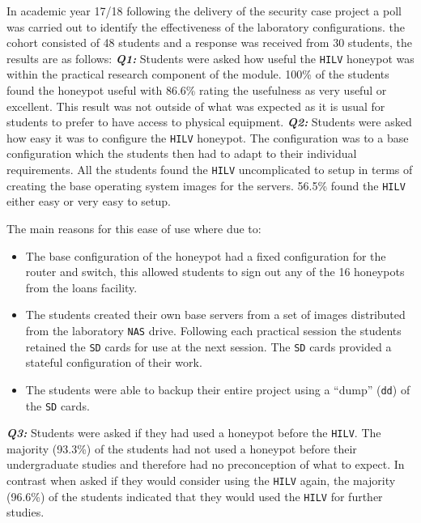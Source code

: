 \documentclass[10pt,journal]{IEEEtran}
\begin{document}
In academic year 17/18 following the delivery of the security case project a poll was carried out to identify the effectiveness of the laboratory configurations. the cohort consisted of 48 students and a response was received from 30 students, the results are as follows:
\newline
\noindent\textbf{\textit{Q1:}} Students were asked how useful the \texttt{HILV} honeypot was within the practical research component of the module. 100\% of the students found the honeypot useful with 86.6\% rating the usefulness as very useful or excellent. This result was not outside of what was expected as it is usual for students to prefer to have access to physical equipment. 
\newline
\noindent\textbf{\textit{Q2:}} Students were asked how easy it was to configure the \texttt{HILV} honeypot. The configuration was to a base configuration which the students then had to adapt to their individual requirements. All the students found the \texttt{HILV} uncomplicated to setup in terms of creating the base operating system images for the servers. 56.5\% found the \texttt{HILV} either easy or very easy to setup. 

\noindent The main reasons for this ease of use where due to:
\begin{itemize}
\item The base configuration of the honeypot had a fixed configuration for the router and switch, this allowed students to sign out any of the 16 honeypots from the loans facility. 
\item The students created their own base servers from a set of images distributed from the laboratory \texttt{NAS} drive. 
Following each practical session the students retained the \texttt{SD} cards for use at the next session. The \texttt{SD} cards provided a stateful configuration of their work. 
\item The students were able to backup their entire project using a ``dump'' (\texttt{dd}) of the \texttt{SD} cards.
\end{itemize}

\noindent\textbf{\textit{Q3:}} Students were asked if they had used a honeypot before the \texttt{HILV}. The majority (93.3\%) of the students had not used a honeypot before their undergraduate studies and therefore had no preconception of what to expect. In contrast when asked if they would consider using the \texttt{HILV} again, the majority (96.6\%) of the students indicated that they would used the \texttt{HILV} for further studies. 
\end{document}
